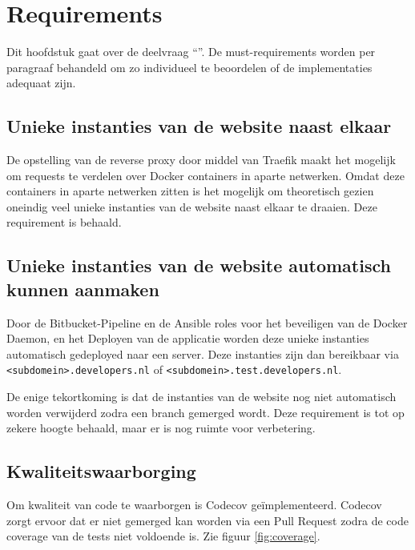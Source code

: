 \chapter{Requirements}

\label{Chapter7}

Dit hoofdstuk gaat over de deelvraag \enquote{\deelrequirements}. De must-requirements worden per paragraaf behandeld om zo individueel te beoordelen of de implementaties adequaat zijn.

\section{Unieke instanties van de website naast elkaar}
De opstelling van de reverse proxy door middel van Traefik maakt het mogelijk om requests te verdelen over Docker containers in aparte netwerken. Omdat deze containers in aparte netwerken zitten is het mogelijk om theoretisch gezien oneindig veel unieke instanties van de website naast elkaar te draaien. Deze requirement is behaald.

\section{Unieke instanties van de website automatisch kunnen aanmaken}
Door de Bitbucket-Pipeline en de Ansible roles voor het beveiligen van de Docker Daemon, en het Deployen van de applicatie worden deze unieke instanties automatisch gedeployed naar een server. Deze instanties zijn dan bereikbaar via \texttt{<subdomein>.developers.nl} of \texttt{<subdomein>.test.developers.nl}.

De enige tekortkoming is dat de instanties van de website nog niet automatisch worden verwijderd zodra een branch gemerged wordt. Deze requirement is tot op zekere hoogte behaald, maar er is nog ruimte voor verbetering.

\section{Kwaliteitswaarborging}
Om kwaliteit van code te waarborgen is Codecov geïmplementeerd. Codecov zorgt ervoor dat er niet gemerged kan worden via een Pull Request zodra de code coverage van de tests niet voldoende is. Zie figuur \ref{fig:coverage}.

